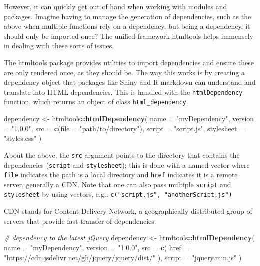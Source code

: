 \documentclass[10pt,]{krantz}
\makeatletter
\newenvironment{Shaded}{\begin{snugshade}}{\end{snugshade}}
\newcommand{\CommentTok}[1]{\textcolor[rgb]{0.37,0.37,0.37}{\textit{#1}}}
\newcommand{\DataTypeTok}[1]{\textcolor[rgb]{0.27,0.27,0.27}{#1}}
\newcommand{\KeywordTok}[1]{\textcolor[rgb]{0.27,0.27,0.27}{\textbf{#1}}}
\newcommand{\NormalTok}[1]{#1}
\newcommand{\OperatorTok}[1]{\textcolor[rgb]{0.43,0.43,0.43}{\textbf{#1}}}
\newcommand{\StringTok}[1]{\textcolor[rgb]{0.5,0.5,0.5}{#1}}
\newenvironment{kframe}{%
\medskip{}
\setlength{\fboxsep}{.8em}
 \def\at@end@of@kframe{}%
 \ifinner\ifhmode%
  \def\at@end@of@kframe{\end{minipage}}%
  \begin{minipage}{\columnwidth}%
 \fi\fi%
 \def\FrameCommand##1{\hskip\@totalleftmargin \hskip-\fboxsep
 \colorbox{shadecolor}{##1}\hskip-\fboxsep
     \hskip-\linewidth \hskip-\@totalleftmargin \hskip\columnwidth}%
 \MakeFramed {\advance\hsize-\width
   \@totalleftmargin\z@ \linewidth\hsize
   \@setminipage}}%
 {\par\unskip\endMakeFramed%
 \at@end@of@kframe}
\renewenvironment{Shaded}{\begin{kframe}}{\end{kframe}}
\newenvironment{rmdblock}[1]
  {
  \begin{itemize}
  \renewcommand{\labelitemi}{
    \raisebox{-.7\height}[0pt][0pt]{
      {\setkeys{Gin}{width=3em,keepaspectratio}\texttt{[image: images/\#1]}}
    }
  }
  \setlength{\fboxsep}{1em}
  \begin{kframe}
  \item
  }
  {
  \end{kframe}
  \end{itemize}
  }
\newenvironment{rmdnote}
  {\begin{rmdblock}{note}}
  {\end{rmdblock}}
\makeatother
\begin{document}
However, it can quickly get out of hand when working with modules and packages. Imagine having to manage the generation of dependencies, such as the above when multiple functions rely on a dependency, but being a dependency, it should only be imported once? The unified framework htmltools helps immensely in dealing with these sorts of issues.

The htmltools package provides utilities to import dependencies and ensure these are only rendered once, as they should be. The way this works is by creating a dependency object that packages like Shiny and R markdown can understand and translate into HTML dependencies. This is handled with the \texttt{htmlDependency} function, which returns an object of class \texttt{html\_dependency}.

\begin{Shaded}
\begin{Highlighting}[]
\NormalTok{dependency <-}\StringTok{ }\NormalTok{htmltools}\OperatorTok{::}\KeywordTok{htmlDependency}\NormalTok{(}
  \DataTypeTok{name =} \StringTok{"myDependency"}\NormalTok{,}
  \DataTypeTok{version =} \StringTok{"1.0.0"}\NormalTok{,}
  \DataTypeTok{src =} \KeywordTok{c}\NormalTok{(}\DataTypeTok{file =} \StringTok{"path/to/directory"}\NormalTok{),}
  \DataTypeTok{script =} \StringTok{"script.js"}\NormalTok{,}
  \DataTypeTok{stylesheet =} \StringTok{"styles.css"}
\NormalTok{)}
\end{Highlighting}
\end{Shaded}

About the above, the \texttt{src} argument points to the directory that contains the dependencies (\texttt{script} and \texttt{stylesheet}); this is done with a named vector where \texttt{file} indicates the path is a local directory and \texttt{href} indicates it is a remote server, generally a CDN. Note that one can also pass multiple \texttt{script} and \texttt{stylesheet} by using vectors, e.g.: \texttt{c("script.js",\ "anotherScript.js")}

\begin{rmdnote}
CDN stands for Content Delivery Network, a geographically distributed
group of servers that provide fast transfer of dependencies.
\end{rmdnote}

\begin{Shaded}
\begin{Highlighting}[]
\CommentTok{# dependency to the latest jQuery}
\NormalTok{dependency <-}\StringTok{ }\NormalTok{htmltools}\OperatorTok{::}\KeywordTok{htmlDependency}\NormalTok{(}
  \DataTypeTok{name =} \StringTok{"myDependency"}\NormalTok{,}
  \DataTypeTok{version =} \StringTok{"1.0.0"}\NormalTok{,}
  \DataTypeTok{src =} \KeywordTok{c}\NormalTok{(}
    \DataTypeTok{href =} \StringTok{"https://cdn.jsdelivr.net/gh/jquery/jquery/dist/"}
\NormalTok{  ),}
  \DataTypeTok{script =} \StringTok{"jquery.min.js"}
\NormalTok{)}
\end{Highlighting}
\end{Shaded}
\end{document}
